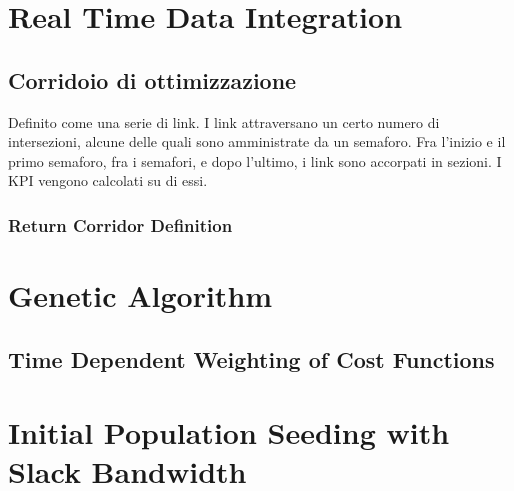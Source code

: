 \section{Real Time Data Integration}


\subsection{Corridoio di ottimizzazione}
Definito come una serie di link.
I link attraversano un certo numero di intersezioni, alcune delle quali sono amministrate da un semaforo.
Fra l'inizio e il primo semaforo, fra i semafori, e dopo l'ultimo, i link sono accorpati in sezioni. I KPI vengono calcolati su di essi.

\subsubsection*{Return Corridor Definition}


\section{Genetic Algorithm}
\subsection{Time Dependent Weighting of Cost Functions}


\section{Initial Population Seeding with Slack Bandwidth}
